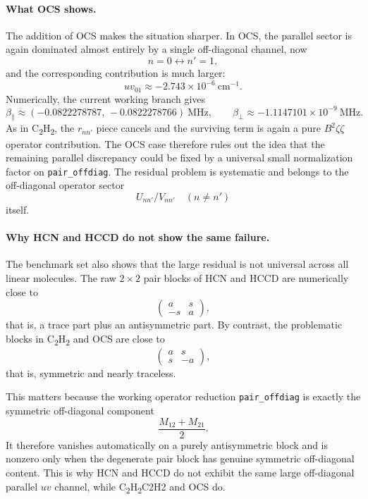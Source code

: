 \documentclass[11pt]{article}
\begin{document}
\paragraph{What \texorpdfstring{OCS}{OCS} shows.}
The addition of OCS makes the situation sharper. In OCS, the parallel sector is
again dominated almost entirely by a single off-diagonal channel, now
\[
n=0 \longleftrightarrow n'=1,
\]
and the corresponding contribution is much larger:
\[
uv_{01}\approx -2.743\times 10^{-6}\ \mathrm{cm}^{-1}.
\]
Numerically, the current working branch gives
\[
\beta_{\parallel}\approx
(-0.0822278787,\,-0.0822278766)\ \mathrm{MHz},
\qquad
\beta_{\perp}\approx -1.1147101\times 10^{-9}\ \mathrm{MHz}.
\]
As in \texorpdfstring{C\textsubscript{2}H\textsubscript{2}}{C2H2}, the
$r_{nn'}$ piece cancels and the surviving term is again a pure
$B^2\zeta\zeta$ operator contribution. The OCS case therefore rules out the
idea that the remaining parallel discrepancy could be fixed by a universal
small normalization factor on \texttt{pair\_offdiag}. The residual problem is
systematic and belongs to the off-diagonal operator sector
\[
U_{nn'}/V_{nn'}\quad (n\neq n')
\]
itself.

\paragraph{Why HCN and HCCD do not show the same failure.}
The benchmark set also shows that the large residual is not universal across
all linear molecules. The raw $2\times 2$ pair blocks of HCN and HCCD are
numerically close to
\[
\begin{pmatrix}
a & s\\
-s & a
\end{pmatrix},
\]
that is, a trace part plus an antisymmetric part. By contrast, the problematic
blocks in \texorpdfstring{C\textsubscript{2}H\textsubscript{2}}{C2H2} and OCS
are close to
\[
\begin{pmatrix}
a & s\\
s & -a
\end{pmatrix},
\]
that is, symmetric and nearly traceless.

This matters because the working operator reduction
\texttt{pair\_offdiag} is exactly the symmetric off-diagonal component
\[
\frac{M_{12}+M_{21}}{2}.
\]
It therefore vanishes automatically on a purely antisymmetric block and is
nonzero only when the degenerate pair block has genuine symmetric off-diagonal
content. This is why HCN and HCCD do not exhibit the same large off-diagonal
parallel $uv$ channel, while
\texorpdfstring{C\textsubscript{2}H\textsubscript{2}}{C2H\textsubscript{2}}{C2H2}
and OCS do.
\end{document}
